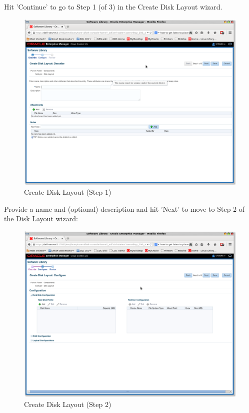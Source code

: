 \documentclass[11pt]{article}
\begin{document}
Hit 'Continue' to go to Step 1 (of 3) in the Create Disk Layout wizard.
\begin{figure}[htb]
\centering
\includegraphics[width=.9\linewidth]{./images/Create_DL_1.png}
\caption{Create Disk Layout (Step 1)}
\end{figure}
\clearpage

Provide a name and (optional) description and hit 'Next' to move to Step 2 of the Disk Layout wizard:
\begin{figure}[htb]
\centering
\includegraphics[width=.9\linewidth]{./images/Create_DL_2.png}
\caption{Create Disk Layout (Step 2)}
\end{figure}
\clearpage
\end{document}
